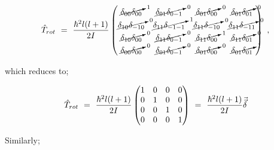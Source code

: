 \documentclass{article}
\begin{document}
\begin{equation} \label{rotor-eq-267-1}
\hat{T}_{rot} \hspace{0.125cm} = \hspace{0.125cm} \frac{\hbar^2 l(l + 1)}{2I} \begin{pmatrix} \cancelto{1}{\delta_{00}\delta_{00}} & \cancelto{0}{\delta_{01}\delta_{0 -1}} & \cancelto{0}{\delta_{01}\delta_{00}} & \cancelto{0}{\delta_{01}\delta_{01}} \\ \cancelto{0}{\delta_{10}\delta_{-1 0}} & \cancelto{1}{\delta_{11}\delta_{-1 -1}} & \cancelto{0}{\delta_{11}\delta_{-10}} & \cancelto{0}{\delta_{11}\delta_{-11}} \\ \cancelto{0}{\delta_{10}\delta_{00}} & \cancelto{0}{\delta_{11}\delta_{0 -1}} & \cancelto{1}{\delta_{11}\delta_{00}} & \cancelto{0}{\delta_{11}\delta_{01}} \\ \cancelto{0}{\delta_{00}\delta_{00}} & \cancelto{0}{\delta_{01}\delta_{0 -1}} & \cancelto{0}{\delta_{01}\delta_{00}} & \cancelto{1}{\delta_{01}\delta_{01}}  \end{pmatrix} \hspace{0.125cm},
\end{equation} 

which reduces to; 

\begin{equation} \label{rotor-eq-268-1}
\hat{T}_{rot} \hspace{0.125cm} = \hspace{0.125cm} \frac{\hbar^2 l(l + 1)}{2I} \begin{pmatrix} 1 & 0 & 0 & 0 \\ 0 & 1 & 0 & 0 \\ 0 & 0 & 1 & 0 \\ 0 & 0 & 0 & 1
\end{pmatrix} \hspace{0.125cm} = \hspace{0.125cm} \frac{\hbar^2 l(l + 1)}{2I}\vec{\vec{\delta}}
\end{equation} 

Similarly; 
\end{document}
